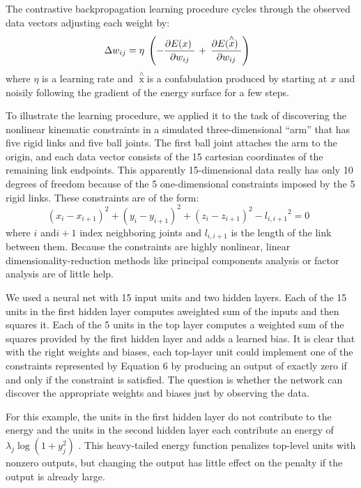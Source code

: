 \par{The contrastive backpropagation learning procedure cycles through the observed data vectors adjusting each weight by:
 \begin{equation}\label{equation5}\Delta {w_{ij}} = \eta \;\left( { - \frac{{\partial E(x){\kern 1pt} {\kern 1pt} {\kern 1pt} }}{{\partial {w_{ij}}}}{\kern 1pt}  + {\kern 1pt} {\kern 1pt} \frac{{\partial E(\mathop x\limits^ \wedge  ){\kern 1pt} {\kern 1pt} {\kern 1pt} }}{{\partial {w_{ij}}}}} \right){\kern 1pt} \;\;\end{equation}
where $\eta$ is a learning rate and   $\mathop x\limits^ \wedge $is a confabulation produced by starting at $x$  and noisily following the gradient of the energy surface for a few steps.
}
\par{To illustrate the learning procedure, we applied it to the task of discovering the nonlinear kinematic constraints in a simulated three-dimensional “arm” that has five rigid links and five ball joints. The first ball joint attaches the arm to the origin, and each data vector consists of the 15 cartesian coordinates of the remaining link endpoints. This apparently 15-dimensional data really has only 10 degrees of freedom because of the 5 one-dimensional constraints imposed by the 5 rigid links. These constraints are of the form:
 \begin{equation}\label{equation6}
{\left( {{x_i} - {x_{i + 1}}} \right)^2} + {\left( {{y_i} - {y_{i + 1}}} \right)^2} + {\left( {{z_i} - {z_{i + 1}}} \right)^2} - {l_{i,i + 1}}^2 = 0\;\;
 \end{equation}
where $i$ and$i + 1$   index neighboring joints and  ${l_{i,i + 1}}$ is the length of the link between them. Because the constraints are highly nonlinear, linear dimensionality-reduction methods like principal components analysis or factor analysis are of little help.
}
\par{We used a neural net with 15 input units and two hidden layers. Each of the 15 units in the first hidden layer computes aweighted sum of the inputs and then squares it. Each of the 5 units in the top layer computes a weighted sum of the squares provided by the first hidden layer and adds a learned bias. It is clear that with the right weights and biases, each top-layer unit could implement one of the constraints represented by Equation 6 by producing an output of exactly zero if and only if the constraint is satisfied. The question is whether the network can discover the appropriate weights and biases just by observing the data.
}
\par{For this example, the units in the first hidden layer do not contribute to the energy and the units in the second hidden layer each contribute an energy of ${\lambda _j}\log (1 + y_j^2)$ . This heavy-tailed energy function penalizes top-level units with nonzero outputs, but changing the output has little effect on the penalty if the output is already large.
}
